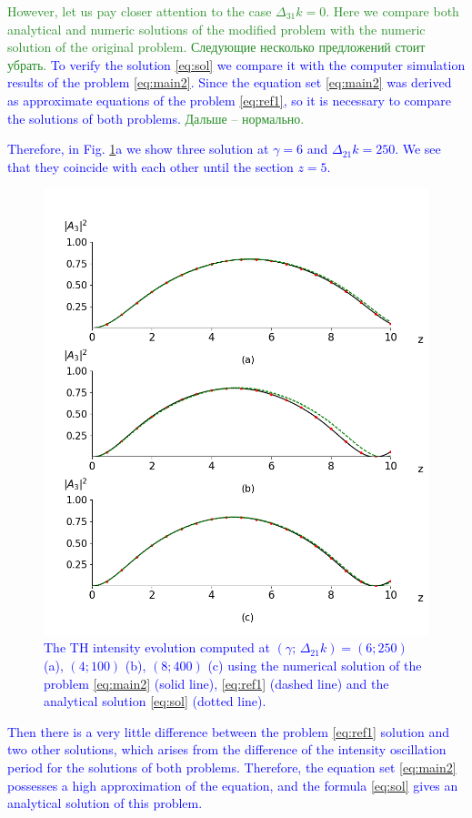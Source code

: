 \documentclass[a4paper, 12pt, onecolumn]{extarticle}
\begin{document}
\textcolor{ForestGreen}{However, let us pay closer attention to the case $\Delta_{31}k=0$. Here we compare both analytical and numeric solutions of the modified problem with the numeric solution of the original problem. Следующие несколько предложений стоит убрать.}
\textcolor{blue}
{
To verify the solution \eqref{eq:sol} we compare it with the computer simulation results of the problem \eqref{eq:main2}. Since the equation set \eqref{eq:main2} was derived as approximate equations of the problem \eqref{eq:ref1}, so it is necessary to compare the solutions of both problems.} \textcolor{ForestGreen}{Дальше -- нормально.} \textcolor{blue}{ Therefore, in Fig. \ref{fr:1}a we show three solution at \(\gamma=6\) and \(\Delta_{21}k=250\). We see that they coincide with each other until the section \(z=5\).
\begin{figure}[h!] 
\centering 
\includegraphics[width=0.5\linewidth]{CascadeI}  
\caption{The TH intensity evolution computed at $(\gamma;\, \Delta_{21} k)=(6;250)$ (a), $(4;100)$ (b), $(8;400)$ (c) using the numerical solution of the problem \eqref{eq:main2} (solid line), \eqref{eq:ref1} (dashed line) and the analytical solution \eqref{eq:sol} (dotted line).}
\label{fr:1}
\end{figure}
}

\textcolor{blue}{
Then there is a very little difference between the problem \eqref{eq:ref1} solution and two other solutions, which arises from the difference of the intensity oscillation period for the solutions of both problems. Therefore, the equation set \eqref{eq:main2} possesses a high approximation of the equation, and the formula \eqref{eq:sol} gives an analytical solution of this problem.
}
\end{document}
